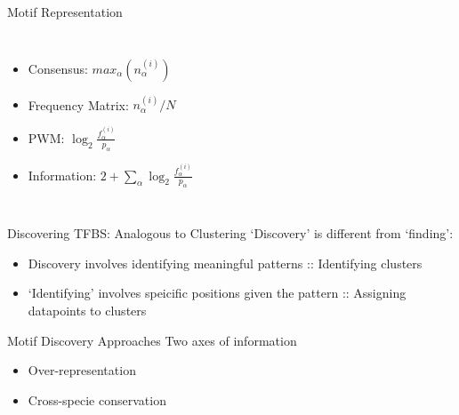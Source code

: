 \documentclass[12pt]{beamer}
\begin{document}
\begin{frame}[fragile]{Motif Representation}
  \begin{columns}[T,onlytextwidth]
\begin{itemize}[<+- | alert@+>]
\item Consensus: $max_\alpha(n_\alpha^{(i)})$
\item Frequency Matrix: $n_{\alpha}^{(i)}/N$
\item PWM: $\log_2\frac{f_\alpha^{(i)}}{p_{\alpha}}$
\item Information: $2+\sum_\alpha \log_2\frac{f_\alpha^{(i)}}{p_{\alpha}}$
\end{itemize}


\end{columns}
\end{frame}

\begin{frame}[fragile]{Discovering TFBS: Analogous to Clustering}
`Discovery' is different from `finding':
\begin{itemize}
\item Discovery involves identifying meaningful patterns :: Identifying clusters
\item `Identifying' involves speicific positions given the pattern :: Assigning datapoints to clusters
\end{itemize}
\end{frame}

\begin{frame}[fragile]{Motif Discovery Approaches}
Two axes of information
\begin{itemize}[<+- | alert@+>]
\item Over-representation
\item Cross-specie conservation
\end{itemize}
\end{frame}
\end{document}
